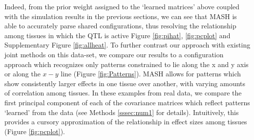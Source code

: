 Indeed, from the prior weight assigned to the `learned matrices' above coupled with the simulation results in the previous sections, we can see that MASH is able to accurately parse shared configurations, thus resolving the relationship among tissues in which the QTL is active Figure \ref{fig:pihat}, \ref{fig:pcplot} and Supplementary Figure \ref{fig:allheat}. 
To further contrast our approach with existing joint methods on this data-set, we compare our results to a configuration approach which recognizes only patterns constrained to lie along the x and y axis or along the $x-y$ line (Figure \ref{fig:Patterns}). MASH allows for patterns which show consistently larger effects in one tissue over another, with varying amounts of correlation among tissues. In these examples from real data, we compare the first principal component of each of the covariance matrices which reflect patterns `learned' from the data (see Methods \ref{sssec:num1} for details). Intuitively, this provides a cursory approximation of the relationship in effect sizes among tissues (Figure \ref{fig:pcplot}). 

